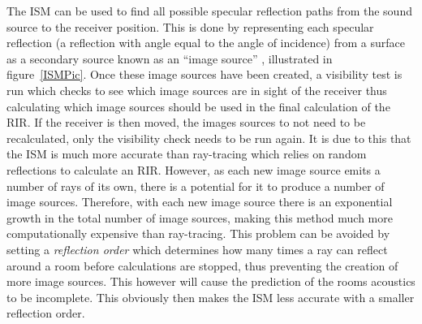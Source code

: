 \documentclass[../../main.tex]{subfiles}
\begin{document}

			The \ac{ISM} can be used to find all possible specular reflection paths from the sound source to the receiver position. This is done by representing each specular reflection (a reflection with angle equal to the angle of incidence) from a surface as a secondary source known as an ``image source'' \cite{Rindel1995}, illustrated in figure~\ref{ISMPic}. Once these image sources have been created, a visibility test is run which checks to see which image sources are in sight of the receiver thus calculating which image sources should be used in the final calculation of the \ac{RIR}. If the receiver is then moved, the images sources to not need to be recalculated, only the visibility check needs to be run again. It is due to this that the \ac{ISM} is much more accurate than ray-tracing which relies on random reflections to calculate an \ac{RIR}. However, as each new image source emits a number of rays of its own, there is a potential for it to produce a number of image sources. Therefore, with each new image source there is an exponential growth in the total number of image sources, making this method much more computationally expensive than ray-tracing. This problem can be avoided by setting a \textit{reflection order} which determines how many times a ray can reflect around a room before calculations are stopped, thus preventing the creation of more image sources. This however will cause the prediction of the rooms acoustics to be incomplete. This obviously then makes the \ac{ISM} less accurate with a smaller reflection order.
\end{document}

